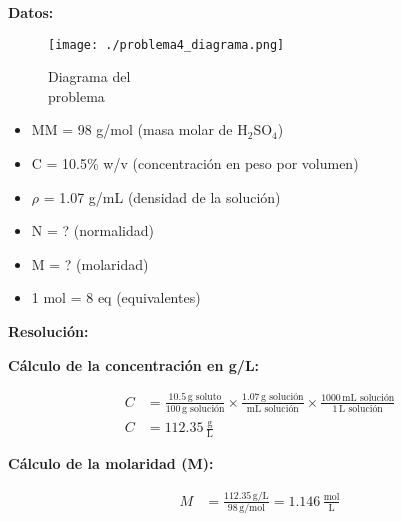 \documentclass{article}
\begin{document}
\noindent\textbf{Datos:} %

\begin{figure}[H]
    \begin{minipage}[t]{0.3\textwidth} %
        \raggedright %
        \texttt{[image: ./problema4\_diagrama.png]} %
        \caption{Diagrama del \\ problema}
    \end{minipage}
\end{figure}

\textbf{} %
\begin{itemize}
\item MM = 98 g/mol (masa molar de H$_2$SO$_4$)
\item C = 10.5\% w/v (concentración en peso por volumen)
\item $\rho$ = 1.07 g/mL (densidad de la solución)
\item N = ? (normalidad)
\item M = ? (molaridad)
\item 1 mol = 8 eq (equivalentes)
\end{itemize}


\noindent\textbf{Resolución:} %

\textbf{Cálculo de la concentración en g/L:}

\begin{align*}
    C &= \frac{10.5 \, \text{g soluto}}{100 \, \text{g solución}} \times \frac{1.07 \, \text{g solución}}{\text{mL solución}} \times \frac{1000 \, \text{mL solución}}{1 \, \text{L solución}} \\[10pt]
    C &= 112.35 \, \frac{\text{g}}{\text{L}}
\end{align*}

\textbf{Cálculo de la molaridad (M):}

\begin{align*}
    M &= \frac{112.35 \, \text{g/L}}{98 \, \text{g/mol}} = 1.146 \, \frac{\text{mol}}{\text{L}}
\end{align*}
\end{document}
